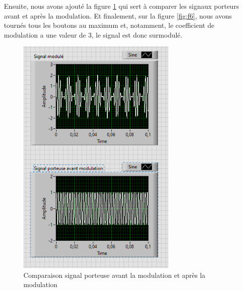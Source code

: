 \documentclass[a4paper]{article}
\begin{document}
Ensuite, nous avons ajouté la figure \ref{fig:f5} qui sert à comparer les signaux porteurs avant et après la modulation. Et finalement, sur la figure \ref{fig:f6}, nous avons tournés tous les boutons au maximum et, notamment, le coefficient de modulation a une valeur de 3, le signal est donc surmodulé.

\begin{figure}[H]
    \centering
    \includegraphics[width=0.70\textwidth]{images/Capture005.PNG}
    \caption{Comparaison signal porteuse avant la modulation et après la modulation}
    \label{fig:f5}
\end{figure}
\end{document}
